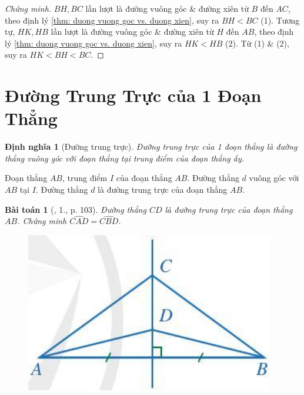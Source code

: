 \documentclass{article}
\newtheorem{baitoan}{Bài toán}
\newtheorem{dinhnghia}{Định nghĩa}
\begin{document}
\begin{proof}[Chứng minh]
	$BH,BC$ lần lượt là đường vuông góc \& đường xiên từ $B$ đến $AC$, theo định lý \ref{thm: duong vuong goc vs. duong xien}, suy ra $BH < BC$ (1). Tương tự, $HK,HB$ lần lượt là đường vuông góc \& đường xiên từ $H$ đến $AB$, theo định lý \ref{thm: duong vuong goc vs. duong xien}, suy ra $HK < HB$ (2). Từ (1) \& (2), suy ra $HK < BH < BC$.
\end{proof}


\section{Đường Trung Trực của 1 Đoạn Thẳng}

\begin{dinhnghia}[Đường trung trực]
	\emph{Đường trung trực} của 1 đoạn thẳng là đường thẳng vuông góc với đoạn thẳng tại trung điểm của đoạn thẳng ấy.
\end{dinhnghia}
Đoạn thẳng $AB$, trung điểm $I$ của đoạn thẳng $AB$. Đường thẳng $d$ vuông góc với $AB$ tại $I$. Đường thẳng $d$ là đường trung trực của đoạn thẳng $AB$.

\begin{baitoan}[\cite{SGK_Toan_7_Canh_Dieu_tap_2}, 1., p. 103]
	Đường thẳng $CD$ là đường trung trực của đoạn thẳng $AB$. Chứng minh $\widehat{CAD} = \widehat{CBD}$.
	\begin{figure}[H]
		\centering
		\includegraphics[scale=.3]{SGK_Toan_7_CD_94}
	\end{figure}
\end{baitoan}
\end{document}
